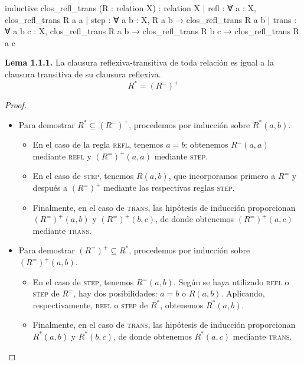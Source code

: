 \documentclass[
  spanish,
  letterpaper,
  DIV=11,
  numbers=noendperiod]{scrreprt}
\newenvironment{Shaded}{\begin{snugshade}}{\end{snugshade}}
\newcommand{\NormalTok}[1]{\textcolor[rgb]{0.00,0.23,0.31}{#1}}
\renewcommand{\NormalTok}[1]{\textcolor[HTML]{000000}{#1}}
\theoremstyle{remark}
\begin{document}
\begin{Shaded}
\begin{Highlighting}[]
\NormalTok{inductive clos\_refl\_trans (R : relation X) : relation X}
\NormalTok{  | refl : ∀ a : X,}
\NormalTok{      clos\_refl\_trans R a a}
\NormalTok{  | step : ∀ a b : X,}
\NormalTok{      R a b → clos\_refl\_trans R a b}
\NormalTok{  | trans : ∀ a b c : X,}
\NormalTok{      clos\_refl\_trans R a b → clos\_refl\_trans R b c →}
\NormalTok{      clos\_refl\_trans R a c}
\end{Highlighting}
\end{Shaded}

\textbf{Lema 1.1.1.} La clausura reflexiva-transitiva de toda relación
es igual a la clausura transitiva de su clausura reflexiva.
\[ R^* = (R^{=})^+ \]

\begin{proof}
\leavevmode

\begin{itemize}
\item
  Para demostrar \(R^* \subseteq(R^{=})^+\), procedemos por inducción
  sobre \(R^*(a,b)\).

  \begin{itemize}
  \item
    En el caso de la regla \textsc{refl}, tenemos \(a=b\): obtenemos
    \(R^{=}(a,a)\) mediante \textsc{refl} y \((R^{=})^+(a,a)\) mediante
    \textsc{step}.
  \item
    En el caso de \textsc{step}, tenemos \(R(a,b)\), que incorporamos
    primero a \(R^{=}\) y después a \((R^{=})^+\) mediante las
    respectivas reglas \textsc{step}.
  \item
    Finalmente, en el caso de \textsc{trans}, las hipótesis de inducción
    proporcionan \((R^{=})^+(a,b)\) y \((R^{=})^+(b,c)\), de donde
    obtenemos \((R^{=})^+(a,c)\) mediante \textsc{trans}.
  \end{itemize}
\item
  Para demostrar \((R^{=})^+\subseteq R^*\), procedemos por inducción
  sobre \((R^{=})^+(a,b)\).

  \begin{itemize}
  \item
    En el caso de \textsc{step}, tenemos \(R^{=}(a,b)\). Según se haya
    utilizado \textsc{refl} o \textsc{step} de \(R^{=}\), hay dos
    posibilidades: \(a=b\) o \(R(a,b)\). Aplicando, respectivamente,
    \textsc{refl} o \textsc{step} de \(R^*\), obtenemos \(R^*(a,b)\).
  \item
    Finalmente, en el caso de \textsc{trans}, las hipótesis de inducción
    proporcionan \(R^*(a,b)\) y \(R^*(b,c)\), de donde obtenemos
    \(R^*(a,c)\) mediante \textsc{trans}.
  \end{itemize}
\end{itemize}

\end{proof}
\end{document}
